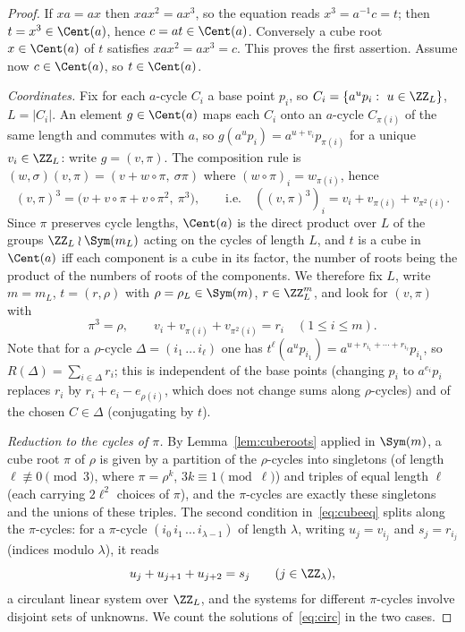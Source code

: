 \begin{proof}
If $xa=ax$ then $xax^{2}=ax^{3}$, so the equation reads $x^{3}=a^{-1}c=t$; then $t=x^{3}\in\Cent(a)$, hence $c=at\in\Cent(a)$. Conversely a cube root $x\in\Cent(a)$ of $t$ satisfies $xax^{2}=ax^{3}=c$. This proves the first assertion. Assume now $c\in\Cent(a)$, so $t\in\Cent(a)$.

\emph{Coordinates.} Fix for each $a$-cycle $C_i$ a base point $p_i$, so $C_i=\{a^{u}p_i:\ u\in\ZZ_{L}\}$, $L=|C_i|$. An element $g\in\Cent(a)$ maps each $C_i$ onto an $a$-cycle $C_{\pi(i)}$ of the same length and commutes with $a$, so $g(a^{u}p_i)=a^{u+v_i}p_{\pi(i)}$ for a unique $v_i\in\ZZ_L$: write $g=(v,\pi)$. The composition rule is $(w,\sigma)(v,\pi)=(v+w\circ\pi,\ \sigma\pi)$ where $(w\circ\pi)_i=w_{\pi(i)}$, hence
\[
(v,\pi)^{3}=\bigl(v+v\circ\pi+v\circ\pi^{2},\ \pi^{3}\bigr),\qquad\text{i.e.}\quad ((v,\pi)^{3})_i=v_i+v_{\pi(i)}+v_{\pi^{2}(i)} .
\]
Since $\pi$ preserves cycle lengths, $\Cent(a)$ is the direct product over $L$ of the groups $\ZZ_L\wr\Sym(m_L)$ acting on the cycles of length $L$, and $t$ is a cube in $\Cent(a)$ iff each component is a cube in its factor, the number of roots being the product of the numbers of roots of the components. We therefore fix $L$, write $m=m_L$, $t=(r,\rho)$ with $\rho=\rho_L\in\Sym(m)$, $r\in\ZZ_L^{m}$, and look for $(v,\pi)$ with
\begin{equation}\label{eq:cubeeq}
\pi^{3}=\rho,\qquad v_i+v_{\pi(i)}+v_{\pi^{2}(i)}=r_i\quad(1\le i\le m).
\end{equation}
Note that for a $\rho$-cycle $\Delta=(i_1\,\ldots\,i_\ell)$ one has $t^{\ell}(a^{u}p_{i_1})=a^{u+r_{i_1}+\cdots+r_{i_\ell}}p_{i_1}$, so $R(\Delta)=\sum_{i\in\Delta}r_i$; this is independent of the base points (changing $p_i$ to $a^{e_i}p_i$ replaces $r_i$ by $r_i+e_i-e_{\rho(i)}$, which does not change sums along $\rho$-cycles) and of the chosen $C\in\Delta$ (conjugating by $t$).

\emph{Reduction to the cycles of $\pi$.} By Lemma~\ref{lem:cuberoots} applied in $\Sym(m)$, a cube root $\pi$ of $\rho$ is given by a partition of the $\rho$-cycles into singletons (of length $\ell\not\equiv0\pmod3$, where $\pi=\rho^{k}$, $3k\equiv1\pmod\ell$) and triples of equal length $\ell$ (each carrying $2\ell^{2}$ choices of $\pi$), and the $\pi$-cycles are exactly these singletons and the unions of these triples. The second condition in~\eqref{eq:cubeeq} splits along the $\pi$-cycles: for a $\pi$-cycle $(i_0\,i_1\,\ldots\,i_{\lambda-1})$ of length $\lambda$, writing $u_j=v_{i_j}$ and $s_j=r_{i_j}$ (indices modulo $\lambda$), it reads
\begin{equation}\label{eq:circ}
u_j+u_{j+1}+u_{j+2}=s_j\qquad (j\in\ZZ_\lambda),
\end{equation}
a circulant linear system over $\ZZ_L$, and the systems for different $\pi$-cycles involve disjoint sets of unknowns. We count the solutions of~\eqref{eq:circ} in the two cases.


\end{proof}
